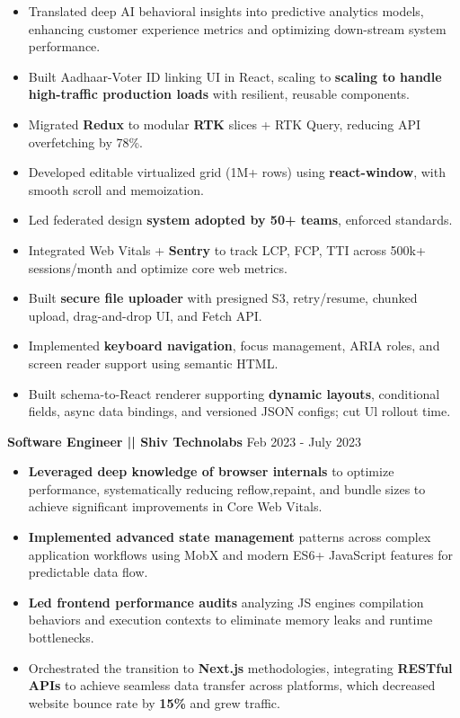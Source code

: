 \documentclass[a4paper]{article}
\begin{document}
\begin{itemize}
\item {Translated deep AI behavioral insights into predictive analytics models, enhancing customer experience metrics and optimizing down-stream system performance.}
\item {Built Aadhaar-Voter ID linking UI in React, scaling to \textbf{scaling to handle high-traffic production loads} with resilient, reusable components.}
\item {Migrated \textbf{Redux} to modular \textbf{RTK} slices + RTK Query, reducing API overfetching by 78\%.}
\item {Developed editable virtualized grid (1M+ rows) using \textbf{react-window}, with smooth scroll and memoization.}
\item {Led federated design \textbf{system adopted by 50+ teams}, enforced standards.}
\item {Integrated Web Vitals + \textbf{Sentry} to track LCP, FCP, TTI across 500k+ sessions/month and optimize core web metrics.}
\item {Built \textbf{secure file uploader} with presigned S3, retry/resume, chunked upload, drag-and-drop UI, and Fetch API.}
\item {Implemented \textbf{keyboard navigation}, focus management, ARIA roles, and screen reader support using semantic HTML.}
\item {Built schema-to-React renderer supporting \textbf{dynamic layouts}, conditional fields, async data bindings, and versioned JSON configs; cut Ul rollout time.}
\end{itemize}




\vspace{5pt}
\textbf{Software Engineer || Shiv Technolabs}
\hfill Feb 2023 - July 2023
\begin{itemize}
\vspace{2pt}
\item {\textbf{Leveraged deep knowledge of browser internals} to optimize performance, systematically reducing reflow,repaint, and bundle sizes to achieve significant improvements in Core Web Vitals.}
\item {\textbf{Implemented advanced state management} patterns across complex application workflows using MobX and modern ES6+ JavaScript features for predictable data flow.}
\item {\textbf{Led frontend performance audits} analyzing JS engines compilation behaviors and execution contexts to eliminate memory leaks and runtime bottlenecks.}
\item {Orchestrated the transition to \textbf{Next.js} methodologies, integrating \textbf{RESTful APIs} to achieve seamless data transfer across platforms, which decreased website bounce rate by \textbf{15\%} and grew traffic.}
\end{itemize}
\end{document}

